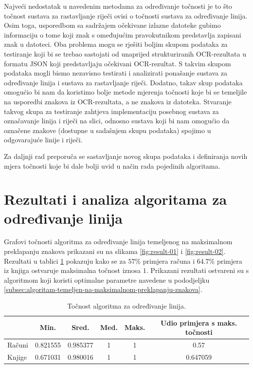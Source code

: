 \documentclass[times, utf8, zavrsni]{fer}
\begin{document}
Najveći nedostatak u navedenim metodama za određivanje točnosti je to što točnost
sustava za rastavljanje riječi ovisi o točnosti sustava za određivanje linija.
Osim toga, usporedbom sa sadržajem očekivane izlazne datoteke gubimo informaciju o tome koji znak s omeđujućim pravokutnikom predstavlja zapisani znak u datoteci. Oba problema mogu se rješiti boljim skupom podataka za testiranje koji bi se trebao sastojati od unaprijed strukturiranih OCR-rezultata u formatu JSON koji predstavljaju očekivani OCR-rezultat. S takvim skupom podataka mogli bismo nezavisno testirati i analizirati ponašanje sustava za određivanje linija i sustava za rastavljanje riječi. Dodatno, takav skup podataka omogućio bi nam da koristimo bolje metode mjerenja točnosti koje bi se temeljile na usporedbi znakova iz OCR-rezultata, a ne znakova iz datoteka.
Stvaranje takvog skupa za testiranje zahtjeva implementaciju posebnog sustava za označavanje linija i riječi na slici, odnosno sustava koji bi nam omogućio da označene znakove (dostupne u sadašnjem skupu podataka) spojimo u odgovarajuće linije i riječi.

Za daljnji rad preporuča se sastavljanje novog skupa podataka i definiranja novih mjera točnosti koje bi dale bolji uvid u način rada pojedinih algoritama.








\section{Rezultati i analiza algoritama za određivanje linija}
\label{sec:rezultati-i-analiza-algoritama-za-odredivanje-linija}
Grafovi točnosti algoritma za određivanje linija temeljenog na maksimalnom preklapanju znakova prikazani su na slikama \ref{fig:result-01} i \ref{fig:result-02}. Rezultati u tablici \ref{tbl:result-01} pokazuju kako se za $57\%$ primjera računa i $64.7\%$ primjera iz knjiga ostvaruje maksimalna točnost iznosa $1$. Prikazani rezultati ostvareni su s algoritmom koji koristi optimalne parametre navedene u pododjeljku \ref{subsec:algoritam-temeljen-na-maksimalnom-preklapanju-znakova}.

\begin{table}[htb]
\caption{Točnost algoritma za određivanje linija.}
\label{tbl:result-01}
\centering
\begin{tabular}{lccccc} \hline
& Min. & Sred. & Med. & Maks. & Udio primjera s maks. točnosti \\ \hline
Računi & 0.821555 & 0.985377 & 1 & 1 & 0.57 \\
Knjige & 0.671031 & 0.980016 & 1 & 1 & 0.647059 \\ \hline
\end{tabular}
\end{table}
\end{document}
